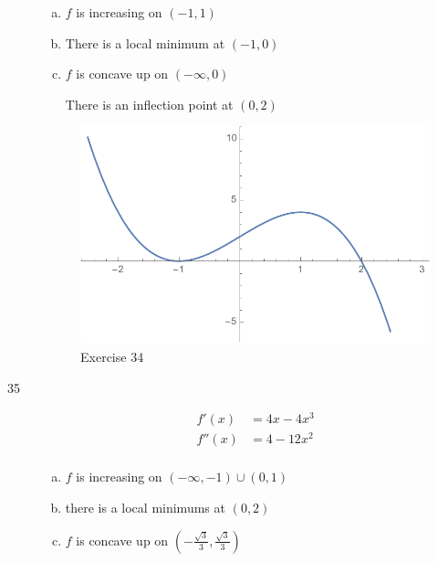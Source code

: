 \documentclass[letterpaper, landscape]{exam}
\begin{document}
\begin{description}
      \begin{enumerate}[(a)]
        \item $f$ is increasing on $(-1, 1)$

        \item There is a local minimum at $(-1, 0)$ 

        \item $f$ is concave up on $\left( -\infty, 0 \right)$ 
          
          There is an inflection point at $(0, 2)$ 

      \end{enumerate}

      \begin{figure}[H]
        \centering
        \includegraphics[scale = 0.6]{ex34.pdf}
        \caption{Exercise 34}
        \label{fig:ex34}
      \end{figure}

    \newpage

    \item[35]
      \begin{align*}
        f'(x)  & = 4x - 4x^3 \\
        f''(x) & = 4 - 12x^2 \\
      \end{align*}

      \begin{enumerate}[(a)]
        \item $f$ is increasing on $(-\infty, -1) \cup (0, 1)$

        \item there is a local minimums at $(0, 2)$ 

        \item $f$ is concave up on $\left( -\frac{\sqrt{3}}{3}, \frac{\sqrt{3}}{3} \right)$ 
          

\end{enumerate}
\end{description}
\end{document}
